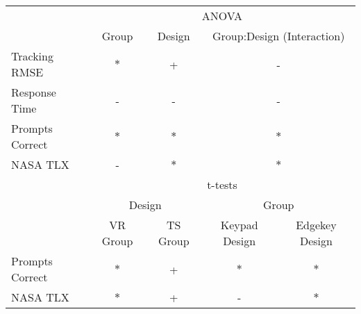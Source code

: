 \begin{tabular}{@{}lcccc@{}}
\toprule
                & \multicolumn{4}{c}{ANOVA} \\
                & Group & Design & \multicolumn{2}{c}{Group:Design (Interaction)}\\
\midrule
Tracking RMSE   & $*$ &  +  & \multicolumn{2}{c}{ - } \\
Response Time   &  -  &  -  & \multicolumn{2}{c}{ - } \\
Prompts Correct & $*$ & $*$ & \multicolumn{2}{c}{$*$} \\
NASA TLX        &  -  & $*$ & \multicolumn{2}{c}{$*$} \\
\midrule
                & \multicolumn{4}{c}{t-tests} \\
                & \multicolumn{2}{c}{Design} & \multicolumn{2}{c}{Group} \\
                & VR Group & TS Group  & Keypad Design & Edgekey Design \\
\midrule
Prompts Correct & $*$ & + & $*$ & $*$ \\
NASA TLX        & $*$ & + &  -  & $*$ \\
\bottomrule
\end{tabular}
